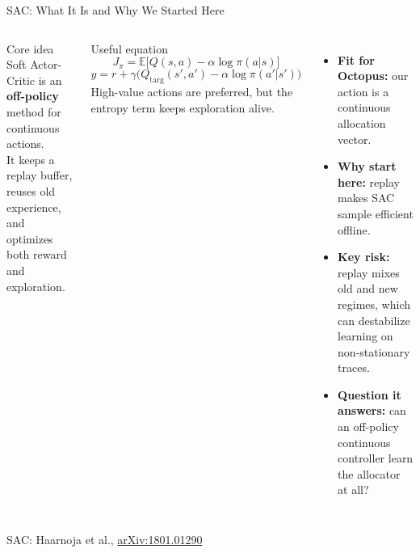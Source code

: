 \documentclass[10pt,aspectratio=169]{beamer}
\begin{document}
\begin{frame}{SAC: What It Is and Why We Started Here}
  \begin{columns}[T,onlytextwidth]
      \begin{block}{Core idea}
        \scriptsize
        Soft Actor-Critic is an \textbf{off-policy} method for continuous actions.\\[0.2em]
        It keeps a replay buffer, reuses old experience, and optimizes both reward and exploration.
      \end{block}

      \begin{block}{Useful equation}
        \scriptsize
        \begin{equation*}
        J_{\pi}
        =
        \mathbb{E}\bigl[Q(s,a) - \alpha \log \pi(a|s)\bigr]
        \end{equation*}
        \begin{equation*}
        y
        =
        r + \gamma\bigl(Q_{\mathrm{targ}}(s',a') - \alpha \log \pi(a'|s')\bigr)
        \end{equation*}
        \scriptsize
        High-value actions are preferred, but the entropy term keeps exploration alive.
      \end{block}
      \scriptsize
      \begin{itemize}
        \item \textbf{Fit for Octopus:} our action is a continuous allocation vector.
        \item \textbf{Why start here:} replay makes SAC sample efficient offline.
        \item \textbf{Key risk:} replay mixes old and new regimes, which can destabilize learning on non-stationary traces.
        \item \textbf{Question it answers:} can an off-policy continuous controller learn the allocator at all?
      \end{itemize}
  \end{columns}

  \vspace{0.2em}
  {\tiny SAC: Haarnoja et al., \href{https://arxiv.org/abs/1801.01290}{arXiv:1801.01290}}
\end{frame}
\end{document}
